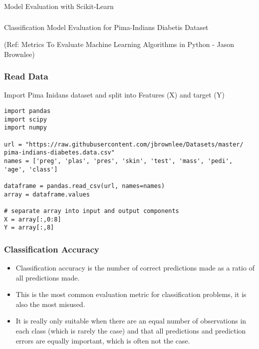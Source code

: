 \begin{frame}[fragile]\frametitle{}
\begin{center}
{\Large Model Evaluation with Scikit-Learn}
\end{center}
\end{frame}

\begin{frame}[fragile]\frametitle{}
\begin{center}
{\Large Classification Model Evaluation for Pima-Indians Diabetis Dataset}

{\tiny (Ref: Metrics To Evaluate Machine Learning Algorithms in Python - Jason Brownlee)}
\end{center}
\end{frame}

\begin{frame}[fragile]\frametitle{Read Data}
Import Pima Inidans dataset and split into Features (X) and target (Y)
\begin{lstlisting}
import pandas
import scipy
import numpy

url = "https://raw.githubusercontent.com/jbrownlee/Datasets/master/ pima-indians-diabetes.data.csv"
names = ['preg', 'plas', 'pres', 'skin', 'test', 'mass', 'pedi', 'age', 'class']

dataframe = pandas.read_csv(url, names=names)
array = dataframe.values

# separate array into input and output components
X = array[:,0:8]
Y = array[:,8]
\end{lstlisting}
\end{frame}

\begin{frame}[fragile]\frametitle{Classification Accuracy}

	\begin{itemize}
	\item Classification accuracy is the number of correct predictions made as a ratio of all predictions made.
	\item This is the most common evaluation metric for classification problems, it is also the most misused. 
	\item It is really only suitable when there are an equal number of observations in each class (which is rarely the case) and that all predictions and prediction errors are equally important, which is often not the case.
	\end{itemize}
	
\end{frame}

